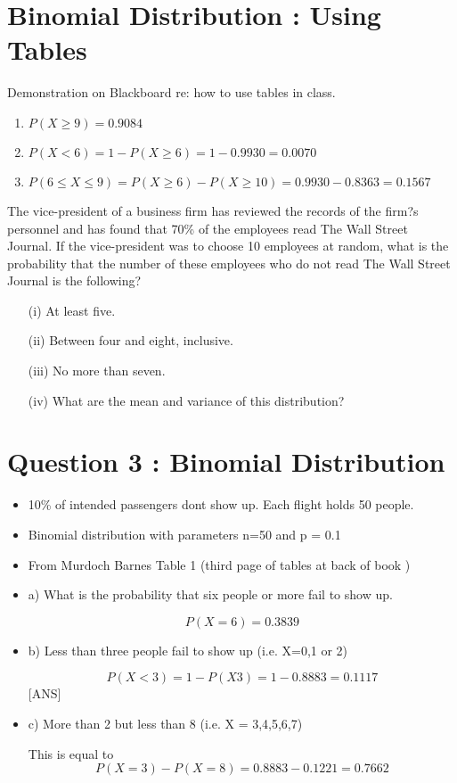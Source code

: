 \documentclass[]{report}
\begin{document}
\section{Binomial Distribution : Using Tables}
	Demonstration on Blackboard re: how to use tables in class.
	\begin{enumerate}
		\item $P(X \geq 9) = 0.9084$
		\item $P(X < 6) = 1- P(X \geq 6) =1 - 0.9930 = 0.0070$
		\item $P(6 \leq X \leq 9) = P(X \geq 6) - P(X \geq 10) = 0.9930 - 0.8363 = 0.1567$
	\end{enumerate}

The vice-president of a business firm has reviewed the records of the firm?s personnel and has found that 70\% of the employees read The Wall Street Journal.
If the vice-president was to choose 10 employees at random, what is the probability that the number of these employees who do not read The Wall Street Journal is the following?
\begin{itemize} 
	\item[(i)]              At least five.
	\item[(ii)]             Between four and eight, inclusive.
	\item[(iii)]             No more than seven.
	\item[(iv) ]            What are the mean and variance of this distribution?
\end{itemize}

\section{Question 3 : Binomial Distribution}

\begin{itemize}
	\item 10\% of intended passengers dont show up. Each flight holds 50 people.
	
	\item Binomial distribution with parameters n=50 and p = 0.1
	
	\item From Murdoch Barnes Table 1 (third page of tables at back of book )
\end{itemize}
\begin{itemize}
	\item a) What is the probability that six people or more fail to show up.
	
	\[P(X=6) =0.3839\]
	
	\item 	b) Less than three people fail to show up (i.e. X=0,1 or 2)
	
	\[P(X < 3) = 1- P(X3) =    1 - 0.8883  = 0.1117\] [ANS]
	
	
	\item c) More than 2 but less than 8   (i.e. X = 3,4,5,6,7)
	
	This is equal to \[P(X=3) - P(X=8) = 0.8883 -0.1221 =  0.7662\]
	
\end{itemize}
\end{document}

